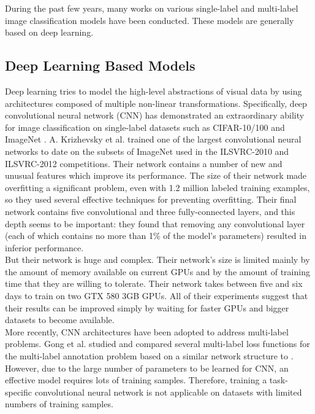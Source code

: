 During the past few years, many works on various single-label and 
multi-label image classification models have been conducted. These models are generally based on deep learning.

\subsection{Deep Learning Based Models}

Deep learning tries to model the high-level abstractions of visual data by using architectures composed of multiple non-linear transformations. Specifically, deep convolutional neural network (CNN)
has demonstrated an extraordinary ability for image classification on single-label datasets such as CIFAR-10/100 \cite{4} and ImageNet \cite{3}. A. Krizhevsky et al. \cite{3}  trained one of the largest convolutional
neural networks to date on the subsets of ImageNet used in the ILSVRC-2010 and ILSVRC-2012
competitions. Their network contains
a number of new and unusual features which improve its performance. The size of their network made overfitting a significant problem, even
with 1.2 million labeled training examples, so they used several effective techniques for preventing
overfitting. Their final network contains five convolutional and
three fully-connected layers, and this depth seems to be important: they found that removing any
convolutional layer (each of which contains no more than 1\% of the model’s parameters) resulted in
inferior performance.\\
But their network is huge and complex. Their network’s size is limited mainly by the amount of memory available on current GPUs
and by the amount of training time that they are willing to tolerate. Their network takes between five
and six days to train on two GTX 580 3GB GPUs. All of their experiments suggest that their results
can be improved simply by waiting for faster GPUs and bigger datasets to become available.\\
More recently, CNN architectures have been
adopted to address multi-label problems. Gong et
al. \cite{5} studied and compared several multi-label
loss functions for the multi-label annotation problem
based on a similar network structure to \cite{3}.\\
However,
due to the large number of parameters to be learned
for CNN, an effective model requires lots of training
samples. Therefore, training a task-specific convolutional neural network is not applicable on datasets
with limited numbers of training samples.







